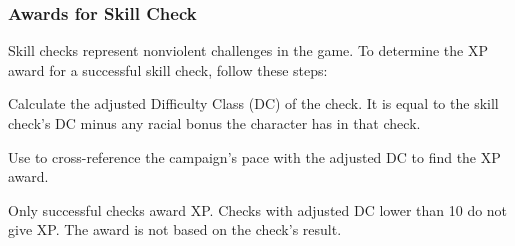 



\subsubsection{Awards for Skill Check}
Skill checks represent nonviolent challenges in the game. To determine the XP award for a successful skill check, follow these steps:

\begin{enumerate*}
	\item Calculate the adjusted Difficulty Class (DC) of the check. It is equal to the skill check's DC minus any racial bonus the character has in that check.
	\item Use  to cross-reference the campaign's pace with the adjusted DC to find the XP award.
\end{enumerate*}
 
Only successful checks award XP. Checks with adjusted DC lower than 10 do not give XP. The award is not based on the check's result.

